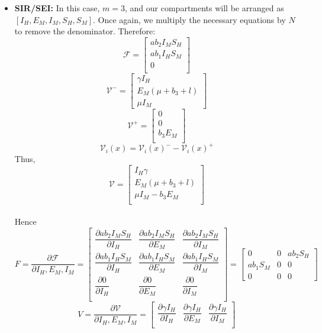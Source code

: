 \begin{itemize}
\item \textbf{SIR/SEI:}
In this case, $m=3$, and our compartments will be arranged as $[I_H, E_M, I_M, S_H, S_M]$. Once again, we multiply the necessary equations by $N$ to remove the denominator. Therefore:
$$ {\mathcal F} =\begin{bmatrix}
a  b_2  I_M  S_H \\
a b_1 I_H S_M\\
0\\
\end{bmatrix} $$
$$
{\mathcal V^-} = \begin{bmatrix}
\gamma I_H\\
E_M (\mu + b_3 + l)\\
\mu I_M
\end{bmatrix}
$$
$$
{\mathcal V^+} = \begin{bmatrix}
0\\
0\\
b_3 E_M \\
\end{bmatrix}
$$
$${\mathcal V}_i (x) = {\mathcal V}_i(x)^{-} - {\mathcal V}_i(x)^+$$
Thus,
$$
{\mathcal V} =
\begin{bmatrix}
I_H \gamma \\
E_M (\mu + b_3 + l)\\
\mu I_M - b_3 E_M\\
\end{bmatrix}
$$
\\
Hence
$$ F = \dfrac{\partial{\mathcal F}}{\partial I_H, E_M, I_M} =\begin{bmatrix}
\dfrac{\partial ab_2 I_M S_H}{\partial I_H} & \dfrac{\partial ab_2 I_M S_H}{\partial E_M} & \dfrac{\partial ab_2 I_M S_H}{\partial I_M}\\
\dfrac{\partial ab_1 I_H S_M}{\partial I_H} & \dfrac{\partial ab_1 I_H S_M}{\partial E_M} & \dfrac{\partial ab_1 I_H S_M}{\partial I_M}\\
\dfrac{\partial 0}{\partial I_H} & \dfrac{\partial 0}{\partial E_M} & \dfrac{\partial 0}{\partial I_M}\\
\end{bmatrix} = 
\begin{bmatrix}
0 & 0 & ab_2 S_H\\
ab_1 S_M & 0 & 0\\
0 & 0 & 0
\end{bmatrix}$$
$$ V = \dfrac{\partial{\mathcal V}}{\partial I_H, E_M, I_M} =\begin{bmatrix}
\dfrac{\partial \gamma I_H}{\partial I_H} & \dfrac{\partial \gamma I_H}{\partial E_M} & \dfrac{\partial \gamma I_H}{\partial I_M}\\

\end{bmatrix}$$
\end{itemize}
